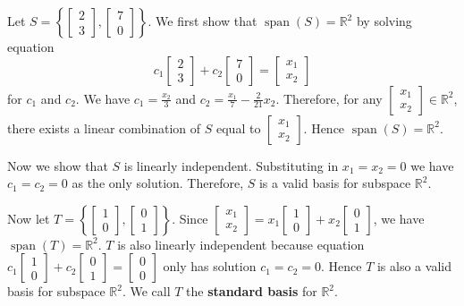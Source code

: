 \documentclass[]{book}
\DeclareMathOperator{\vecspan}{span}
\newcommand{\vecxx}[1][x]{\ensuremath{\begin{bmatrix}
#1_1 \\
#1_2
\end{bmatrix}}}
\begin{document}
\begin{example}
    \label{expl:basis not unique}
    Let $S=\left\{\begin{bmatrix}2 \\ 3\end{bmatrix}, \begin{bmatrix}7 \\ 0\end{bmatrix}\right\}$. We first show that $\vecspan(S)=\mathbb{R}^2$ by solving equation \[c_1\begin{bmatrix}2 \\ 3\end{bmatrix} + c_2\begin{bmatrix}7 \\ 0\end{bmatrix}=\vecxx\] for $c_1$ and $c_2$. We have $c_1=\frac{x_2}{3}$ and $c_2=\frac{x_1}{7} - \frac{2}{21}x_2$. Therefore, for any $\vecxx \in \mathbb{R}^2$, there exists a linear combination of $S$ equal to $\vecxx$. Hence $\vecspan(S)=\mathbb{R}^2$. 
    
    Now we show that $S$ is linearly independent. Substituting in $x_1=x_2=0$ we have $c_1=c_2=0$ as the only solution. Therefore, $S$ is a valid basis for subspace $\mathbb{R}^2$.
    
    Now let $T=\left\{\begin{bmatrix}1 \\ 0\end{bmatrix}, \begin{bmatrix}0 \\ 1\end{bmatrix}\right\}$. Since $\vecxx = x_1\begin{bmatrix}1 \\ 0\end{bmatrix} + x_2\begin{bmatrix}0 \\ 1\end{bmatrix}$, we have $\vecspan(T)=\mathbb{R}^2$. $T$ is also linearly independent because equation $c_1\begin{bmatrix}1 \\ 0\end{bmatrix} + c_2\begin{bmatrix}0 \\ 1\end{bmatrix} = \begin{bmatrix}0 \\ 0\end{bmatrix}$ only has solution $c_1=c_2=0$. Hence $T$ is also a valid basis for subspace $\mathbb{R}^2$. We call $T$ the \textbf{standard basis} for $\mathbb{R}^2$. \hfill \qedsymbol
\end{example}
\end{document}
